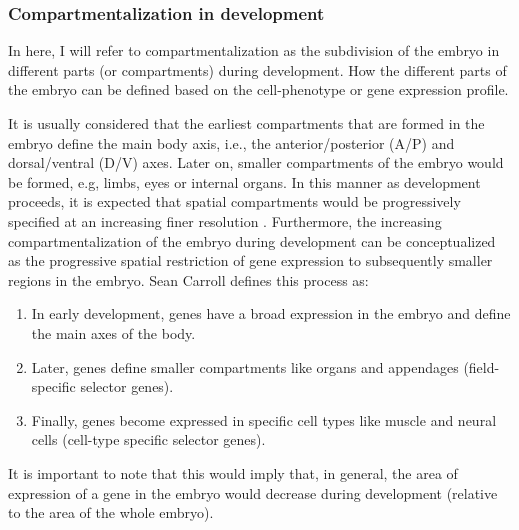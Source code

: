 \subsubsection{Compartmentalization in development}

In here, I will refer to compartmentalization as the subdivision of the embryo in different parts (or compartments) during development. 
How the different parts of the embryo can be defined based on the cell-phenotype or gene expression profile.

It is usually considered that the earliest compartments that are formed in the embryo define the main body axis, i.e., the anterior/posterior (A/P) and dorsal/ventral (D/V) axes.
Later on, smaller compartments of the embryo would be formed, e.g, limbs, eyes or internal organs. In this manner as development proceeds, it is expected that spatial compartments would be progressively specified at an increasing finer resolution \citep{Davidson2001}.
Furthermore, the increasing compartmentalization of the embryo during development can be conceptualized as the progressive spatial restriction of gene expression to subsequently smaller regions in the embryo.
Sean Carroll defines this process\citep{Carroll2001} as:
\begin{enumerate}
\item In early development, genes have a broad expression in the embryo and define the main axes of the body.
\item Later, genes define smaller compartments like organs and appendages (field-specific selector genes).
\item Finally, genes become expressed in specific cell types like muscle and neural cells (cell-type specific selector genes). 
\end{enumerate}
It is important to note that this would imply that, in general, the area of expression of a gene in the embryo would decrease during development (relative to the area of the whole embryo).

